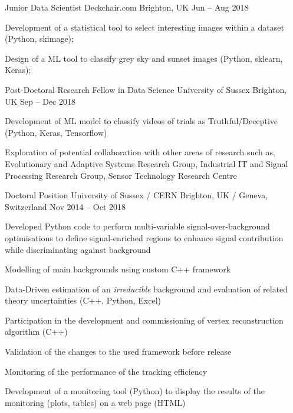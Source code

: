 \begin{cventries}
    \cventry
    {Junior Data Scientist}
    {Deckchair.com}
    {Brighton, UK}
    {Jun -- Aug 2018}
    {
      \begin{cvitems}
        \item Development of a statistical tool to select interesting images within a dataset (Python, skimage);
        \item Design of a ML tool to classify grey sky and sunset images (Python, sklearn, Keras);
      \end{cvitems}
    }
  \end{cventries}


  \begin{cventries}
    \cventry
    {Post-Doctoral Research Fellow in Data Science}
    {University of Sussex}
    {Brighton, UK}
    {Sep -- Dec 2018}
    {
      \begin{cvitems}
        \item Development of ML model to classify videos of trials as Truthful/Deceptive (Python, Keras, Tensorflow)
        \item Exploration of potential collaboration with other areas of research such as, Evolutionary and Adaptive Systems Research Group, Industrial IT and Signal Processing Research Group, Sensor Technology Research Centre
      \end{cvitems}
    }
  \end{cventries}

  \begin{cventries}
    \cventry
    {Doctoral Position}
    {University of Sussex / CERN}
    {Brighton, UK / Geneva, Switzerland}
    {Nov 2014 -- Oct 2018}
    {
    \begin{cvitems}
      \item Developed Python code to perform multi-variable signal-over-background optimisations to define signal-enriched regions to enhance signal contribution while discriminating against background
      \item Modelling of main backgrounds using custom C++ framework
      \item Data-Driven estimation of an \emph{irreducible} background and evaluation of related theory uncertainties (C++, Python, Excel)
      \item Participation in the development and commissioning of vertex reconstruction algorithm (C++)
      \item Validation of the changes to the used framework before release
      \item Monitoring of the performance of the tracking efficiency
      \item Development of a monitoring tool (Python) to display the results of the monitoring (plots, tables) on a web page (HTML)
    \end{cvitems}
    }
  \end{cventries}

